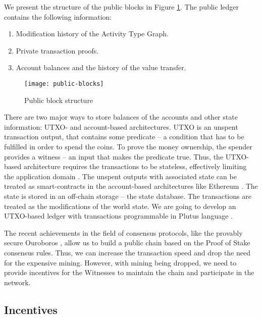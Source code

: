 We present the structure of the public blocks in Figure \ref{fig:publicblocks}. The public ledger contains the following information:
\begin{enumerate}
\item Modification history of the Activity Type Graph.
\item Private transaction proofs.
\item Account balances and the history of the value transfer.
\end{enumerate}

\begin{figure}[ht]
\centering
\texttt{[image: public-blocks]}
\caption{Public block structure}
\label{fig:publicblocks}
\end{figure}

There are two major ways to store balances of the accounts and other state information: UTXO- and account-based architectures. UTXO is an unspent transaction output, that contains some predicate -- a condition that has to be fulfilled in order to spend the coins. To prove the money ownership, the spender provides a witness -- an input that makes the predicate true. Thus, the UTXO-based architecture requires the transactions to be stateless, effectively limiting the application domain \cite{bentov2017instantaneous}.  The unspent outputs with associated state can be treated as smart-contracts in the account-based architectures like Ethereum \cite{wood2014ethereum}. The state is stored in an off-chain storage -- the state database. The transactions are treated as the modifications of the world state. We are going to develop an UTXO-based ledger with transactions programmable in Plutus language \cite{Plutus}.

The recent achievements in the field of consensus protocols, like the provably secure Ouroboros \cite{kiayias2017ouroboros}, allow us to build a public chain based on the Proof of Stake consensus rules. Thus, we can increase the transaction speed and drop the need for the expensive mining. However, with mining being dropped, we need to provide incentives for the Witnesses to maintain the chain and participate in the network.

\subsection{Incentives}

